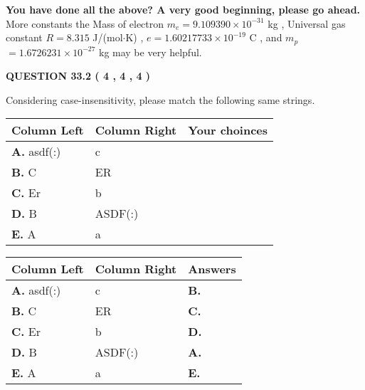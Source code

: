 \documentclass[12pt]{article}
\begin{document}
   
   
   
\vspace{0.3in}
{\textbf{\LARGE{You have done all the above? A very good beginning, please go ahead.}}}
More constants the
Mass of electron
$m_e$$ =
9.109390 \times 10^{-31} $
kg
,
Universal gas constant
$R$$ =
8.315 $
J/(mol$\cdot $K)
,
$e$$ =
1.60217733 \times 10^{-19} $
C
, and
$m_p$$ =
1.6726231 \times 10^{-27} $
kg
%
may be very helpful.
\vspace{0.3in}
   
   
  
\vspace{0.2in}
  
{\textbf{\Large{QUESTION
33.2 
 (           4 ,           4 ,           4 )
}}}
  
  
Considering case-insensitivity, please match the following same strings.
  
  
\begin{tabular}{|l|l|l|}
 \hline
 Column Left & Column Right  & Your choinces \\ 
 \hline
{\textbf{\large{
A.}}}
asdf(:)
  & 
c
 & 
 \\ 
 \hline
{\textbf{\large{
B.}}}
C
  & 
ER
 & 
 \\ 
 \hline
{\textbf{\large{
C.}}}
Er
  & 
b
 & 
 \\ 
 \hline
{\textbf{\large{
D.}}}
B
  & 
ASDF(:)
 & 
 \\ 
 \hline
{\textbf{\large{
E.}}}
A
  & 
a
 & 
 \\ 
 \hline
 \end{tabular}
  
  
 
 
\noindent{}
  
  
\begin{tabular}{|l|l|l|}
 \hline
 Column Left & Column Right  & Answers       \\ 
 \hline
{\textbf{\large{
A.}}}
asdf(:)
  & 
c
 & 
{\textbf{\large{
B.}}}
 \\ 
 \hline
{\textbf{\large{
B.}}}
C
  & 
ER
 & 
{\textbf{\large{
C.}}}
 \\ 
 \hline
{\textbf{\large{
C.}}}
Er
  & 
b
 & 
{\textbf{\large{
D.}}}
 \\ 
 \hline
{\textbf{\large{
D.}}}
B
  & 
ASDF(:)
 & 
{\textbf{\large{
A.}}}
 \\ 
 \hline
{\textbf{\large{
E.}}}
A
  & 
a
 & 
{\textbf{\large{
E.}}}
 \\ 
 \hline
 \end{tabular}
  
\end{document}
